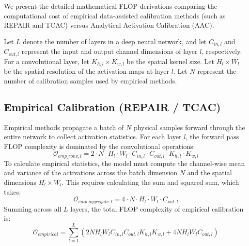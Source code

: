 \documentclass{article}
\theoremstyle{plain}
\theoremstyle{definition}
\theoremstyle{remark}
\begin{document}
We present the detailed mathematical FLOP derivations comparing the computational cost of empirical data-assisted calibration methods (such as REPAIR and TCAC) versus Analytical Activation Calibration (AAC).

Let $L$ denote the number of layers in a deep neural network, and let $C_{in, l}$ and $C_{out, l}$ represent the input and output channel dimensions of layer $l$, respectively. For a convolutional layer, let $K_{h, l} \times K_{w, l}$ be the spatial kernel size. Let $H_l \times W_l$ be the spatial resolution of the activation maps at layer $l$. Let $N$ represent the number of calibration samples used by empirical methods.

\subsection{Empirical Calibration (REPAIR / TCAC)}
Empirical methods propagate a batch of $N$ physical samples forward through the entire network to collect activation statistics. For each layer $l$, the forward pass FLOP complexity is dominated by the convolutional operations:
\begin{equation}
    \mathcal{O}_{emp\_conv, l} = 2 \cdot N \cdot H_l \cdot W_l \cdot C_{in, l} \cdot C_{out, l} \cdot K_{h, l} \cdot K_{w, l}
\end{equation}
To calculate empirical statistics, the model must compute the channel-wise mean and variance of the activations across the batch dimension $N$ and the spatial dimensions $H_l \times W_l$. This requires calculating the sum and squared sum, which takes:
\begin{equation}
    \mathcal{O}_{emp\_aggregate, l} = 4 \cdot N \cdot H_l \cdot W_l \cdot C_{out, l}
\end{equation}
Summing across all $L$ layers, the total FLOP complexity of empirical calibration is:
\begin{equation}
    \mathcal{O}_{empirical} = \sum_{l=1}^L \left( 2 N H_l W_l C_{in, l} C_{out, l} K_{h, l} K_{w, l} + 4 N H_l W_l C_{out, l} \right)
\end{equation}
\end{document}
